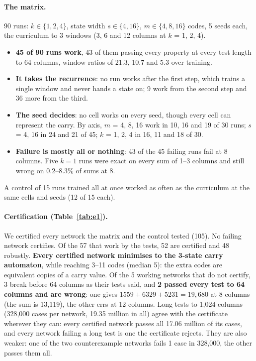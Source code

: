 \documentclass[11pt]{article}
\begin{document}
\paragraph{The matrix.} 90 runs: $k \in \{1,2,4\}$, state width $s \in \{4, 16\}$, $m \in \{4, 8, 16\}$
codes, 5 seeds each, the curriculum to 3 windows (3, 6 and 12 columns at $k$ = 1, 2, 4).
\begin{itemize}
\item \textbf{45 of 90 runs work}, 43 of them passing every property at every test length to 64
  columns, window ratios of 21.3, 10.7 and 5.3 over training.
\item \textbf{It takes the recurrence}: no run works after the first step, which trains a single
  window and never hands a state on; 9 work from the second step and 36 more from the third.
\item \textbf{The seed decides}: no cell works on every seed, though every cell can represent the
  carry. By axis, $m$ = 4, 8, 16 work in 10, 16 and 19 of 30 runs; $s$ = 4, 16 in 24 and 21 of 45;
  $k$ = 1, 2, 4 in 16, 11 and 18 of 30.
\item \textbf{Failure is mostly all or nothing}: 43 of the 45 failing runs fail at 8 columns.
  Five $k=1$ runs were exact on every sum of 1--3 columns and still wrong on 0.2--8.3\% of sums at 8.
\end{itemize}
A control of 15 runs trained all at once worked as often as the curriculum at the same cells and
seeds (12 of 15 each).

\paragraph{Certification (Table~\ref{tab:e1}).} We certified every network the matrix and the control
tested (105). No failing network certifies. Of the 57 that work by the tests, 52 are certified and
48 robustly. \textbf{Every certified network minimises to the 3-state carry automaton}, while
reaching 3--11 codes (median 5): the extra codes are equivalent copies of a carry value. Of the 5
working networks that do not certify, 3 break before 64 columns as their tests said, and
\textbf{2 passed every test to 64 columns and are wrong}: one gives $1559 + 6329 + 5231 = 19{,}680$
at 8 columns (the sum is 13{,}119), the other errs at 12 columns. Long tests to 1{,}024 columns
(328{,}000 cases per network, 19.35 million in all) agree with the certificate wherever they can:
every certified network passes all 17.06 million of its cases, and every network failing a long
test is one the certificate rejects. They are also weaker: one of the two counterexample networks
fails 1 case in 328{,}000, the other passes them all.
\end{document}

